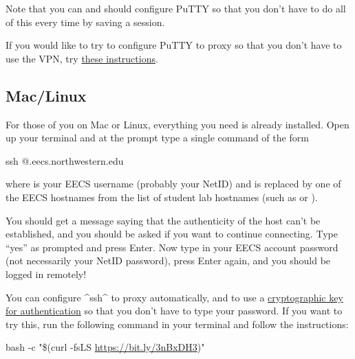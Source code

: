 \documentclass{tufte-handout}
\def\PuTTYhelpUrl{https://nu-cs211.github.io/cs211-files/putty_setup_guide.pdf}
\def\setupScriptUrl{https://bit.ly/3nBxDH3}
\def\setupScriptLink{\href{\setupScriptUrl}{\setupScriptUrl}}
\begin{document}
Note that you can and should configure PuTTY so that you don't have to do all
of this every time by saving a session.

If you would like to try to configure PuTTY to proxy so that
you don’t have to use the VPN, try \href{\PuTTYhelpUrl}{these
instructions}.

\subsection{Mac/Linux}

For those of you on Mac or Linux, everything you need is already
installed. Open up your terminal and at the prompt
type a single command of the form

\begin{CmdLine*}
  \C ssh @.eecs.northwestern.edu\\
\end{CmdLine*}

\noindent where  is your EECS username (probably your NetID)
and  is replaced by one of the EECS hostnames from the list
of student lab hostnames%
\marginnote{\LabHostnamesLink}
(such as  or
).

You should get a message saying that the authenticity of the host
can't be established, and you should be asked if you want to continue
connecting.  Type ``yes'' as prompted and press Enter. Now type in your
EECS account password (not necessarily your NetID password), press
Enter again, and you should be logged in remotely!

You can configure ^ssh^ to proxy automatically, and to use a
\href{https://en.wikipedia.org/wiki/Key_authentication}{cryptographic
key for authentication} so that you don’t have to type your password. If
you want to try this, run the following command in your terminal and
follow the instructions:

\begin{CmdLine*}
  \C bash -c "\$(curl -fsLS \setupScriptLink)"\\
\end{CmdLine*}
\end{document}
